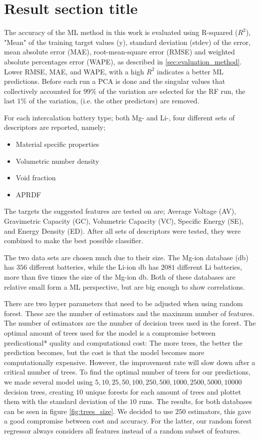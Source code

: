 \section{Result section title}

The accuracy of the ML method in this work is evaluated using R-squared ($R^2$), "Mean" of the training target values (y), standard deviation (stdev) of the error, mean absolute error (MAE), root-mean-square error (RMSE) and weighted absolute percentages error (WAPE), as described in \ref{sec:evaluation_method}. Lower RMSE, MAE, and WAPE, with a high $R^2$ indicates a better ML predictions. 
Before each run a PCA is done and the singular values that collectively accounted for $99\%$ of the variation are selected for the RF run, the last $1\%$ of the variation, (i.e. the other predictors) are removed.

For each intercalation battery type; both Mg- and Li-, four different sets of descriptors are reported, namely;

\begin{itemize}
\item Material specific properties
\item Volumetric number density 
\item Void fraction
\item APRDF
\end{itemize}


The targets the suggested features are tested on are; Average Voltage (\ac{AV}), Gravimetric Capacity (\ac{GC}), Volumetric Capacity (\ac{VC}), Specific Energy (\ac{SE}), and Energy Density (\ac{ED}). 
After all sets of descriptors were tested, they were combined to make the best possible classifier.

The two data sets are chosen much due to their size. The Mg-ion database (\ac{db}) has $356$ different batteries, while the Li-ion db has $2081$ different Li batteries, more than five times the size of the Mg-ion db. Both of these databases are relative small form a ML perspective, but are big enough to show correlations. 

There are two hyper parameters that need to be adjusted when using random forest. These are the number of estimators and the maximum number of features. The number of estimators are the number of decision trees used in the forest. The optimal amount of trees used for the model is a compromise between predicational* quality and computational cost: The more trees, the better the prediction becomes, but the cost is that the model becomes more computationally expensive. However, the improvement rate will slow down after a critical number of trees. To find the optimal number of trees for our predictions, we made several model using  $5,10,25,50,100,250,500,1000,2500,5000,10000$ decision trees, creating $10$ unique forests for each amount of trees and plottet them with the standard deviation of the $10$ runs. The results, for both databases can be seen in figure \ref{fig:trees_size}. We decided to use $250$ estimators, this gave a good compromise between cost and accuracy.  For the latter, our random forest regressor always considers all features instead of a random subset of features. 

